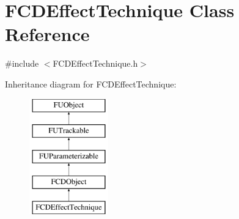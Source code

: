 \hypertarget{classFCDEffectTechnique}{
\section{FCDEffectTechnique Class Reference}
\label{classFCDEffectTechnique}
}


{\ttfamily \#include $<$FCDEffectTechnique.h$>$}

Inheritance diagram for FCDEffectTechnique:\begin{figure}[H]
\begin{center}
\leavevmode
\includegraphics[height=5.000000cm]{classFCDEffectTechnique}
\end{center}
\end{figure}
